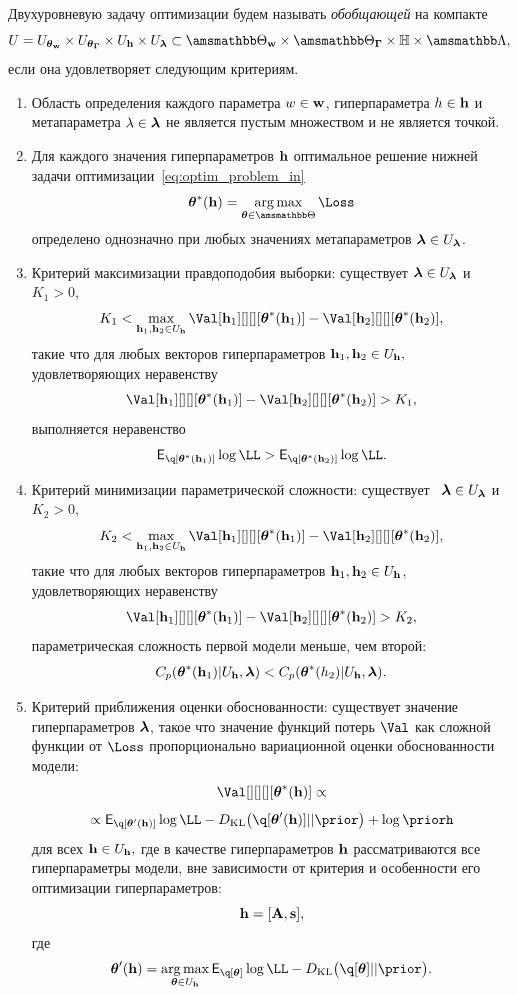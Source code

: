 \begin{defin}
Двухуровневую задачу оптимизации будем называть \textit{обобщающей} на компакте $$U = \Utetaw \times \UtetaG \times \Uh \times \Ulam \subset \Tetawb \times \TetaGb \times \Hb \times \Lamb,$$ если она удовлетворяет следующим критериям.
\begin{enumerate}
\item Область определения каждого параметра $w \in \mathbf{w}$, гиперпараметра $h \in \mathbf{h}$ и метапараметра $\lambda \in \boldsymbol{\lambda}$ не  является пустым множеством и не является точкой.
\item Для каждого значения гиперпараметров $\mathbf{h}$ оптимальное решение нижней задачи оптимизации~\eqref{eq:optim_problem_in} 
\[
\teta^{*}(\h) = \argmax_{\teta \in \Tetab} \Loss
\]
определено однозначно при любых значениях метапараметров $\boldsymbol{\lambda} \in U_{\boldsymbol{\lambda}}$.

\item Критерий максимизации правдоподобия выборки: существует $\boldsymbol{\lambda} \in U_{\boldsymbol{\lambda}}$ и  $K_1>0$,$$K_1 < \max_{\h_1,\h_2 \in \Uh} \Val[\h_1][][][\teta^{*}(\h_1)] - \Val[\h_2][][][\teta^{*}(\h_2)],$$ такие что для любых векторов гиперпараметров $\mathbf{h}_1, \mathbf{h}_2 \in U_{\mathbf{h}},$ удовлетворяющих неравенству $$\Val[\h_1][][][\teta^{*}(\h_1)] - \Val[\h_2][][][\teta^{*}(\h_2)] > K_1,$$ выполняется неравенство $$\E_{\q[\teta^{*}(\h_1)]}\log\LL > \E_{\q[\teta^{*}(\h_2)]}\log\LL.$$

\item Критерий минимизации параметрической сложности:  существует  $\boldsymbol{\lambda} \in U_{\boldsymbol{\lambda}}$ и $K_2>0,$ $$K_2 < \max_{\h_1, \h_2 \in \Uh} \Val[\h_1][][][\teta^{*}(\h_1)] - \Val[\h_2][][][\teta^{*}(\h_2)],$$ такие что для любых векторов гиперпараметров $\mathbf{h}_1,\mathbf{h}_2 \in U_{\mathbf{h}}$, удовлетворяющих неравенству $$\Val[\h_1][][][\teta^{*}(\h_1)] - \Val[\h_2][][][\teta^{*}(\h_2)]>K_2,$$ параметрическая сложность первой модели меньше, чем второй: $$C_p(\boldsymbol{\theta}^{*}(\mathbf{h}_1)|U_{\mathbf{h}},\boldsymbol{\lambda})<C_p(\boldsymbol{\theta}^{*}(h_2)|U_{\mathbf{h}},\boldsymbol{\lambda}).$$

\item Критерий приближения оценки обоснованности: существует значение гиперпараметров $\boldsymbol{\lambda}$, такое что значение функций потерь $\Val$ как сложной функции от $\Loss$ пропорционально вариационной оценки обоснованности модели: $$\Val[][][][\teta^{*}(\h)] \propto $$
$$\propto
\E_{\q[\teta'(\h)]}\log\LL - \KL{\q[\teta'(\h)]}{\prior} + \log\priorh$$ для всех $\mathbf{h} \in U_{\mathbf{h}},$
где в качестве гиперпараметров $\mathbf{h}$ рассматриваются все гиперпараметры модели, вне зависимости от критерия и особенности его оптимизации гиперпараметров: $$\mathbf{h} = [\mathbf{A}, \mathbf{s}],$$
где $$\teta'(\h) = \argmax_{\teta \in \Uh} \E_{\q[\teta]}\log\LL - \KL{\q[\teta]}{\prior}.$$


\end{enumerate}
\end{defin}
